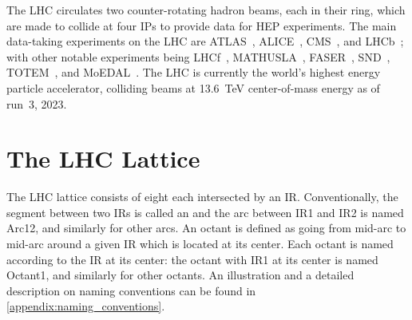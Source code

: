 The \gls{LHC} circulates two counter-rotating \gls{hadron} \glspl{beam}, each in their ring, which are made to collide at four \glspl{IP} to provide data for \gls{HEP} \glspl{experiment}.
The main data-taking experiments on the \gls{LHC} are \acrshort{ATLAS}~\cite{ATLAS_Paper,Website:ATLAS,Website:ATLAS_CDS}, \acrshort{ALICE}~\cite{ALICE_Paper,Website:ALICE,Website:ALICE_CDS}, \acrshort{CMS}~\cite{CMS_Paper,Website:CMS,Website:CMS_CDS}, and \acrshort{LHCb}~\cite{LHCb_Paper,Website:LHCb,Website:LHCb_CDS}; with other notable experiments being LHCf~\cite{LHCf_Paper,Website:LHCf,Website:LHCf_CDS}, MATHUSLA~\cite{MATHUSLA_Paper,Website:MATHUSLA,Website:MATHUSLA_CDS}, FASER~\cite{FASER_Paper,Website:FASER,Website:FASER_CDS}, SND~\cite{SND_Paper,Website:SND,Website:SND_CDS}, TOTEM~\cite{TOTEM_Paper,Website:TOTEM,Website:TOTEM_CDS}, and MoEDAL~\cite{MoEDAL_Paper,Website:MOEDAL,Website:MOEDAL_CDS}.
The \gls{LHC} is currently the world's highest energy particle accelerator, colliding beams at \qty{13.6}{\tera\electronvolt} center-of-mass energy as of \Gls{run}~\num{3}, \num{2023}.


\section{The LHC Lattice}
\label{section:lhc_lattice}

The \gls{LHC} lattice consists of eight  each intersected by an \gls{IR}.
Conventionally, the segment between two \glspl{IR} is called an  and the arc between IR1 and IR2 is named Arc12, and similarly for other arcs.
An octant is defined as going from mid-arc to mid-arc around a given \gls{IR} which is located at its center.
Each octant is named according to the \gls{IR} at its center: the octant with IR\num{1} at its center is named Octant1, and similarly for other octants.
An illustration and a detailed description on naming conventions can be found in \cref{appendix:naming_conventions}.

